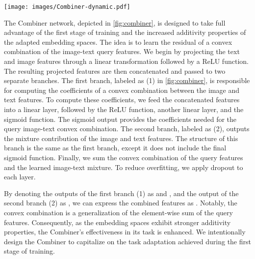\documentclass[acmlarge]{acmart}
\begin{document}
\begin{figure*}[tb]
    \centering
    \texttt{[image: images/Combiner-dynamic.pdf]}
    \caption{Architecture of the Combiner network . It takes as input the multimodal query features and outputs a unified representation.  represents the sigmoid function. We denote the outputs of the first branch (1) as  and , while the output of the second branch (2) as . The combined features are }
    \label{fig:combiner}
\end{figure*}

The Combiner network, depicted in \cref{fig:combiner}, is designed to take full advantage of the first stage of training and the increased additivity properties of the adapted embedding spaces. The idea is to learn the residual of a convex combination of the image-text query features.
We begin by projecting the text and image features through a linear transformation followed by a ReLU function. The resulting projected features are then concatenated and passed to two separate branches. The first branch, labeled as (1) in \cref{fig:combiner}, is responsible for computing the coefficients of a convex combination between the image and text features.
To compute these coefficients, we feed the concatenated features into a linear layer, followed by the ReLU function, another linear layer, and the sigmoid function. The sigmoid output provides the coefficients needed for the query image-text convex combination.
The second branch, labeled as (2), outputs the mixture contribution of the image and text features. The structure of this branch is the same as the first branch, except it does not include the final sigmoid function.
Finally, we sum the convex combination of the query features and the learned image-text mixture. To reduce overfitting, we apply dropout to each layer.

By denoting the outputs of the first branch (1) as  and , and the output of the second branch (2) as , we can express the combined features as . Notably, the convex combination  is a generalization of the element-wise sum of the query features. Consequently, as the embedding spaces exhibit stronger additivity properties, the Combiner's effectiveness in its task is enhanced. We intentionally design the Combiner to capitalize on the task adaptation achieved during the first stage of training.
\end{document}
